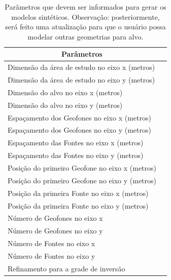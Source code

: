 \documentclass[a4paper, 12 pt]{article} %
\begin{document}
\begin{table}[!hbtp]
	\caption{Parâmetros que devem ser informados para gerar os modelos sintéticos. Observação: posteriormente, será feito uma atualização para que o usuário possa modelar outras geometrias para alvo.}
	\centering
	\label{parametros}
	\begin{tabular}{@{}ll@{}}
		\toprule
		\multicolumn{1}{c}{Parâmetros} &  \\ \midrule
		\rowcolor[HTML]{EFEFEF} 
		Dimensão da área de estudo no eixo x (metros)   
		&   
		\\
		Dimensão da área de estudo no eixo y (metros)   
		& 
		\\
		\rowcolor[HTML]{EFEFEF} 
		Dimensão do alvo no eixo x (metros)         
		&       
		\\
		Dimensão do alvo no eixo y (metros)         
		&    
		\\
		\rowcolor[HTML]{EFEFEF} 
		Espaçamento dos Geofones no eixo x (metros) &           
		\\
		Espaçamento dos Geofones no eixo y (metros)         &           
		\\
		\rowcolor[HTML]{EFEFEF} 
		Espaçamento das Fontes no eixo x (metros)    &                   
		\\
		Espaçamento das Fontes no eixo y (metros)           &    
		\\
		\rowcolor[HTML]{EFEFEF} 
		Posição do primeiro Geofone no eixo x (metros)    &                   
		\\
		Posição do primeiro Geofone no eixo y (metros)    &    
		\\
		\rowcolor[HTML]{EFEFEF} 
		Posição da primeira Fonte no eixo x (metros)    &                   
		\\
		Posição da primeira Fonte no eixo y (metros)        &    
		\\
		\rowcolor[HTML]{EFEFEF} 
		Número de Geofones no eixo x     &                   
		\\
		Número de Geofones no eixo y
		&    
		\\
		\rowcolor[HTML]{EFEFEF} 
		Número de Fontes no eixo x     
		&                   
		\\
		Número de Fontes no eixo y
		&    
		\\
		\rowcolor[HTML]{EFEFEF} 
		Refinamento para a grade de inversão     
		&                   
		    
		                                 \\ \bottomrule
	\end{tabular}
\end{table}
\end{document}
